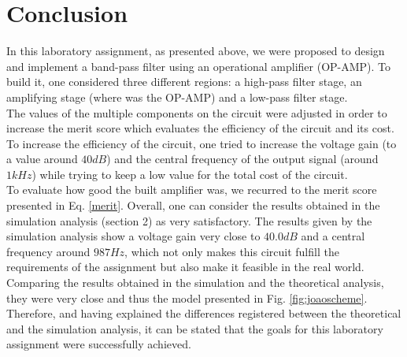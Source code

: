 \section{Conclusion}
In this laboratory assignment, as presented above, we were proposed to design and implement a band-pass filter using an operational amplifier (OP-AMP). To build it, one considered three different regions: a high-pass filter stage, an amplifying stage (where was the OP-AMP) and a low-pass filter stage. \\

The values of the multiple components on the circuit were adjusted in order to increase the merit score which evaluates the efficiency of the circuit and its cost. To increase the efficiency of the circuit, one tried to increase the voltage gain (to a value around $40dB$) and the central frequency of the output signal (around $1kHz$) while trying to keep a low value for the total cost of the circuit. \\

To evaluate how good the built amplifier was, we recurred to the merit score presented in Eq. \eqref{merit}. Overall, one can consider the results obtained in the simulation analysis (section 2) as very satisfactory. The results given by the simulation analysis show a voltage gain very close to $40.0dB$ and a central frequency around $987Hz$, which not only makes this circuit fulfill the requirements of the assignment but also make it feasible in the real world.\\

Comparing the results obtained in the simulation and the theoretical analysis, they were very close and thus the model presented in Fig. \ref{fig:joaoscheme}.\\

Therefore, and having explained the differences registered between the theoretical and the simulation analysis, it can be stated that the goals for this laboratory assignment were successfully achieved.